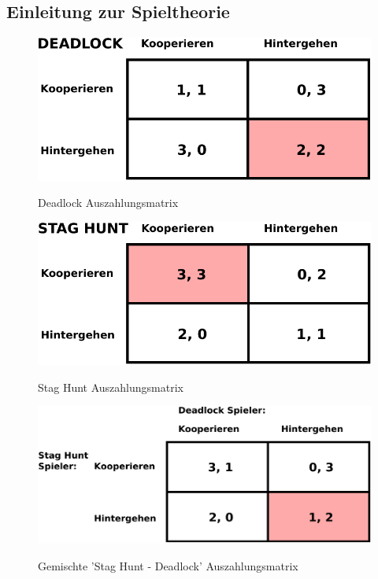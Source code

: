\subsection{Einleitung zur Spieltheorie}

\begin{figure}%
\centering
\caption{Deadlock Auszahlungsmatrix}
\includegraphics[scale=0.8]{Grafiken/Deadlock_Ink.pdf} 
\label{pic:Deadlock}
\end{figure}

\begin{figure}%
\centering
\caption{Stag Hunt Auszahlungsmatrix}
\includegraphics[scale=0.8]{Grafiken/Stag_Hunt_Ink.pdf} 
\label{pic:StagHunt}
\end{figure}

\begin{figure}%
\centering
\caption{Gemischte 'Stag Hunt - Deadlock' Auszahlungsmatrix}
\includegraphics[scale=0.8]{Grafiken/Mixed_Ink.pdf} 
\label{pic:Mixed}
\end{figure}

